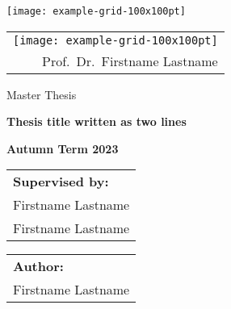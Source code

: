 \begin{titlepage}
\begin{center}
\thispagestyle{empty}


\texttt{[image: example-grid-100x100pt]}
\hfill
\begin{tabular}[b]{r}
    \texttt{[image: example-grid-100x100pt]} \\ 
    Prof.~Dr.~Firstname Lastname
\end{tabular}

\noindent\makebox[\linewidth]{\color{gray}\rule{\paperwidth}{0.1pt}}

\vspace{1.0cm}
    
{\Large Master Thesis}

\vspace{5cm}

{\huge \bf Thesis title \break written as two lines}

\vspace{3cm}

{\large \bf Autumn Term 2023}

\vfill

\noindent\makebox[\linewidth]{\color{gray}\rule{\paperwidth}{0.1pt}}

\begin{tabular}[t]{l}
    \textbf{Supervised by:} \\
    Firstname Lastname \\
    Firstname Lastname
\end{tabular}
\hfill
\begin{tabular}[t]{l}
    \textbf{Author:} \\
    Firstname Lastname
\end{tabular}

\end{center}
\end{titlepage}

\restoregeometry
